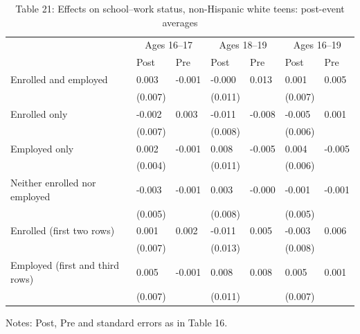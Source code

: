 \documentclass[12pt]{article}
\begin{document}
\begin{table}
\centering
\caption{Table 21: Effects on school--work status, non-Hispanic white teens: post-event averages}

\small
\begin{tabular}{p{}p{}p{}p{}p{}p{}p{}}
\toprule
 & \multicolumn{2}{c}{Ages 16--17} & \multicolumn{2}{c}{Ages 18--19} & \multicolumn{2}{c}{Ages 16--19} \\

 & Post & Pre & Post & Pre & Post & Pre \\
\midrule
Enrolled and employed & 0.003 & -0.001 & -0.000 & 0.013 & 0.001 & 0.005 \\
 & (0.007) &  & (0.011) &  & (0.007) &  \\
Enrolled only & -0.002 & 0.003 & -0.011 & -0.008 & -0.005 & 0.001 \\
 & (0.007) &  & (0.008) &  & (0.006) &  \\
Employed only & 0.002 & -0.001 & 0.008 & -0.005 & 0.004 & -0.005 \\
 & (0.004) &  & (0.011) &  & (0.006) &  \\
Neither enrolled nor employed & -0.003 & -0.001 & 0.003 & -0.000 & -0.001 & -0.001 \\
 & (0.005) &  & (0.008) &  & (0.005) &  \\
Enrolled (first two rows) & 0.001 & 0.002 & -0.011 & 0.005 & -0.003 & 0.006 \\
 & (0.007) &  & (0.013) &  & (0.008) &  \\
Employed (first and third rows) & 0.005 & -0.001 & 0.008 & 0.008 & 0.005 & 0.001 \\
 & (0.007) &  & (0.011) &  & (0.007) &  \\
\bottomrule
\end{tabular}



\noindent\small Notes: Post, Pre and standard errors as in Table 16.

\end{table}
\end{document}

